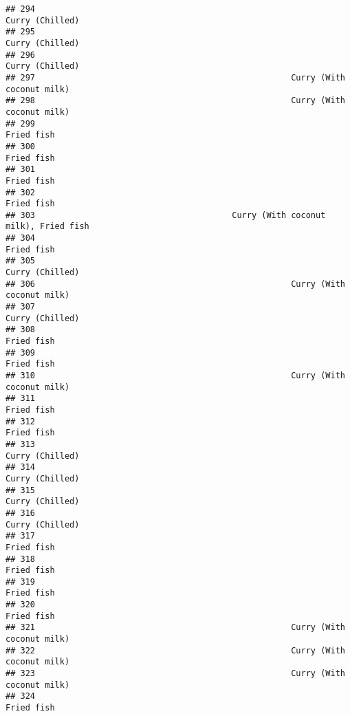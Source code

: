 \documentclass[
]{article}
\begin{document}
\begin{verbatim}
## 294                                                              Curry (Chilled)
## 295                                                              Curry (Chilled)
## 296                                                              Curry (Chilled)
## 297                                                    Curry (With coconut milk)
## 298                                                    Curry (With coconut milk)
## 299                                                                   Fried fish
## 300                                                                   Fried fish
## 301                                                                   Fried fish
## 302                                                                   Fried fish
## 303                                        Curry (With coconut milk), Fried fish
## 304                                                                   Fried fish
## 305                                                              Curry (Chilled)
## 306                                                    Curry (With coconut milk)
## 307                                                              Curry (Chilled)
## 308                                                                   Fried fish
## 309                                                                   Fried fish
## 310                                                    Curry (With coconut milk)
## 311                                                                   Fried fish
## 312                                                                   Fried fish
## 313                                                              Curry (Chilled)
## 314                                                              Curry (Chilled)
## 315                                                              Curry (Chilled)
## 316                                                              Curry (Chilled)
## 317                                                                   Fried fish
## 318                                                                   Fried fish
## 319                                                                   Fried fish
## 320                                                                   Fried fish
## 321                                                    Curry (With coconut milk)
## 322                                                    Curry (With coconut milk)
## 323                                                    Curry (With coconut milk)
## 324                                                                   Fried fish

\end{verbatim}
\end{document}
